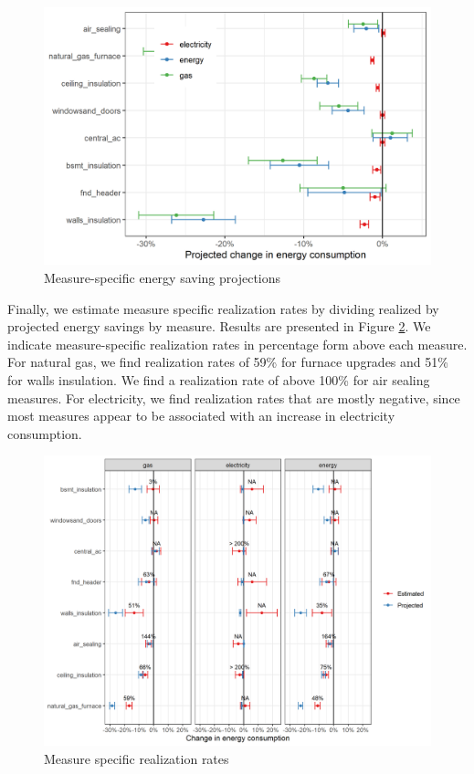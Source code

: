 \documentclass{article}
\begin{document}
\begin{figure}
	\includegraphics{../output_figures_tables/projected_es_mbm.png}
	\caption{Measure-specific energy saving projections}\label{fig_mbm_proj}
\end{figure}


Finally, we estimate measure specific realization rates by dividing realized by projected energy savings by measure.  Results are presented in Figure \ref{fig_rr_mbm}. We indicate measure-specific realization rates in percentage form above each measure. For natural gas, we find realization rates of 59\% for furnace upgrades and 51\% for walls insulation. We find a realization rate of above 100\% for air sealing measures. For electricity, we find realization rates that are mostly negative, since most measures appear to be associated with an increase in electricity consumption.

\begin{figure}
	\includegraphics[width=\linewidth]{../output_figures_tables/mbm_realization_rate.png}
	\caption{Measure specific realization rates}\label{fig_rr_mbm}
\end{figure}
\end{document}
